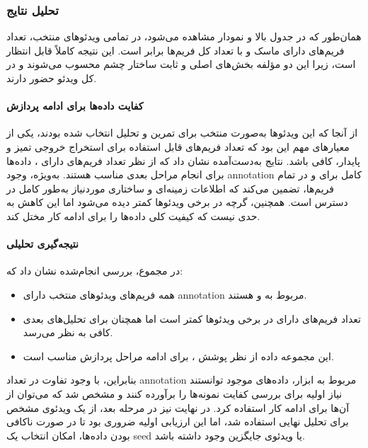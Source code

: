 \documentclass{article}
\begin{document}
\subsubsection{تحلیل نتایج}

همان‌طور که در جدول بالا و نمودار مشاهده می‌شود، در تمامی ویدئوهای منتخب، تعداد فریم‌های دارای ماسک  و  با تعداد کل فریم‌ها برابر است. این نتیجه کاملاً قابل انتظار است، زیرا این دو مؤلفه بخش‌های اصلی و ثابت ساختار چشم محسوب می‌شوند و در کل ویدئو حضور دارند.


\paragraph{کفایت داده‌ها برای ادامه پردازش}

از آنجا که این ویدئوها به‌صورت منتخب برای تمرین و تحلیل انتخاب شده بودند، یکی از معیارهای مهم این بود که تعداد فریم‌های قابل استفاده برای استخراج خروجی تمیز و پایدار، کافی باشد. نتایج به‌دست‌آمده نشان داد که از نظر تعداد فریم‌های دارای ، داده‌ها برای انجام مراحل بعدی مناسب هستند. به‌ویژه، وجود annotation کامل برای  و  در تمام فریم‌ها، تضمین می‌کند که اطلاعات زمینه‌ای و ساختاری موردنیاز به‌طور کامل در دسترس است. همچنین، گرچه  در برخی ویدئوها کمتر دیده می‌شود اما این کاهش به حدی نیست که کیفیت کلی داده‌ها را برای ادامه کار مختل کند.

\paragraph{نتیجه‌گیری تحلیلی}

در مجموع، بررسی انجام‌شده نشان داد که:
\begin{itemize}
	\item همه فریم‌های ویدئوهای منتخب دارای annotation مربوط به  و  هستند.
	\item تعداد فریم‌های دارای  در برخی ویدئوها کمتر است اما همچنان برای تحلیل‌های بعدی کافی به نظر می‌رسد.
	\item این مجموعه داده از نظر پوشش ، برای ادامه مراحل پردازش مناسب است.
\end{itemize}

بنابراین، با وجود تفاوت در تعداد annotation مربوط به ابزار، داده‌های موجود توانستند نیاز اولیه برای بررسی کفایت نمونه‌ها را برآورده کنند و مشخص شد که می‌توان از آن‌ها برای ادامه کار استفاده کرد. در نهایت نیز در مرحله بعد، از یک ویدئوی مشخص برای تحلیل نهایی استفاده شد، اما این ارزیابی اولیه ضروری بود تا در صورت ناکافی بودن داده‌ها، امکان انتخاب یک seed یا ویدئوی جایگزین وجود داشته باشد.
\end{document}
